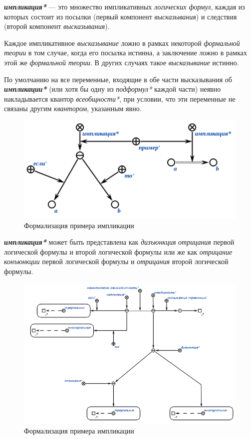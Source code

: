 \textbf{\textit{импликация*}} --- это множество импликативных \textit{логических формул}, каждая из которых состоит из посылки (первый компонент \textit{высказывания}) и следствия (второй компонент \textit{высказывания}).

Каждое импликативное \textit{высказывание} ложно в рамках некоторой \textit{формальной теории} в том случае, когда его посылка истинна, а заключение ложно в рамках этой же \textit{формальной теории}. В других случаях такое \textit{высказывание} истинно.

По умолчанию на все переменные, входящие в обе части высказывания об \textbf{\textit{импликации*}} (или хотя бы одну из \textit{подформул*} каждой части) неявно накладывается квантор \textit{всеобщности*}, при условии, что эти переменные не связаны другим \textit{квантором}, указанным явно.

\begin{figure}[H]
\includegraphics[scale=0.8]{author/part2/figures/logic/implication.png}
\caption{Формализация примера импликации}
\label{fig:implication}
\end{figure}

\textbf{\textit{импликация*}} может быть представлена как \textit{дизъюнкция} \textit{отрицания} первой логической формулы и второй логической формулы или же как \textit{отрицание} \textit{конъюнкции} первой логической формулы и \textit{отрицания} второй логической формулы.

\begin{figure}[H]
	\includegraphics[scale=0.8]{author/part2/figures/logic/implication_representation.png}
	\caption{Формализация примера импликации}
	\label{fig:implication_representation}
\end{figure}

